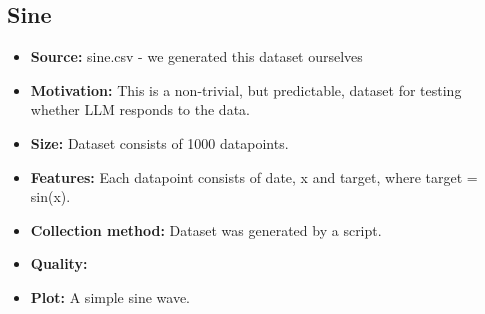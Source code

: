 \subsection{Sine}
\begin{itemize}
	\item \textbf{Source:} sine.csv - we generated this dataset ourselves
	\item \textbf{Motivation:} This is a non-trivial, but predictable, dataset for testing whether LLM responds to the data.
	\item \textbf{Size:} Dataset consists of 1000 datapoints.
	\item \textbf{Features:} Each datapoint consists of date, x and target, where target = sin(x).
	\item \textbf{Collection method:} Dataset was generated by a script.
	\item \textbf{Quality:}
	\item \textbf{Plot:} A simple sine wave.
\end{itemize}

